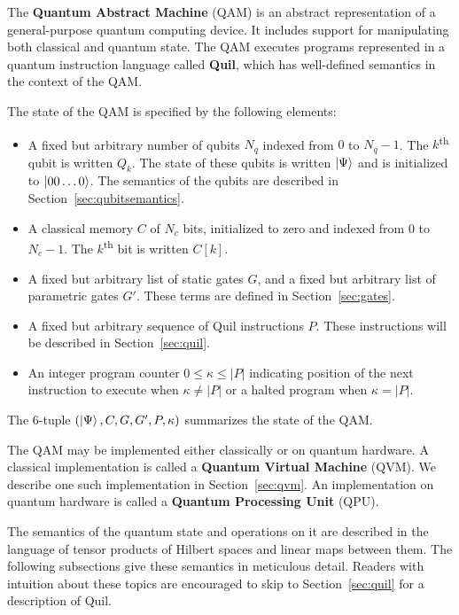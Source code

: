 \documentclass[conference]{IEEEtran}
\newcommand{\defn}[1]{\textbf{#1}}
\begin{document}
The \defn{Quantum Abstract Machine} (QAM) is an abstract representation of a general-purpose quantum computing device. It includes support for manipulating both classical and quantum state. The QAM executes programs represented in a quantum instruction language called \defn{Quil}, which has well-defined semantics in the context of the QAM.

The state of the QAM is specified by the following elements:
\begin{itemize}
\item A fixed but arbitrary number of qubits $N_q$ indexed from $0$ to $N_q-1$. The $k$\textsuperscript{th} qubit is written $Q_k$. The state of these qubits is written $\ket{\Psi}$ and is initialized to $\ket{00\ldots0}$. The semantics of the qubits are described in Section~\ref{sec:qubitsemantics}.
\item A classical memory $C$ of $N_c$ bits, initialized to zero and indexed from $0$ to $N_c-1$. The $k$\textsuperscript{th} bit is written $C[k]$.
\item A fixed but arbitrary list of static gates $G$, and a fixed but arbitrary list of parametric gates $G'$. These terms are defined in Section~\ref{sec:gates}.
\item A fixed but arbitrary sequence of Quil instructions $P$. These instructions will be described in Section~\ref{sec:quil}.
\item An integer program counter $0 \le \kappa \le \vert P\vert$ indicating position of the next instruction to execute when $\kappa\neq\vert P\vert$ or a halted program when $\kappa=\vert P\vert$.
\end{itemize}
The 6-tuple $(\ket{\Psi}, C, G, G', P, \kappa)$ summarizes the state of the QAM.

The QAM may be implemented either classically or on quantum hardware. A classical implementation is called a \defn{Quantum Virtual Machine} (QVM). We describe one such implementation in Section~\ref{sec:qvm}. An implementation on quantum hardware is called a \defn{Quantum Processing Unit} (QPU).

The semantics of the quantum state and operations on it are described in the language of tensor products of Hilbert spaces and linear maps between them. The following subsections give these semantics in meticulous detail. Readers with intuition about these topics are encouraged to skip to Section~\ref{sec:quil} for a description of Quil.
\end{document}
